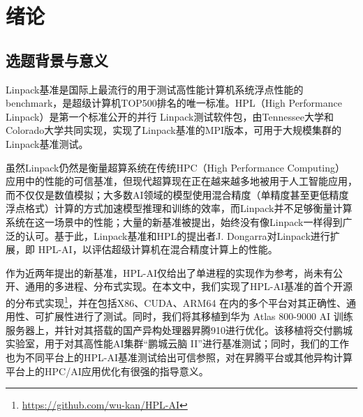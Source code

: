 
\chapter{绪论}

\label{绪论}

\section{选题背景与意义}


Linpack\cite{dongarra1979linpack}基准是国际上最流行的用于测试高性能计算机系统浮点性能的 benchmark，是超级计算机TOP500排名的唯一标准。HPL\cite{HPL}（High Performance Linpack）是第一个标准公开的并行 Linpack测试软件包，由Tennessee大学和Colorado大学共同实现，实现了Linpack基准的MPI版本，可用于大规模集群的Linpack基准测试。

虽然Linpack仍然是衡量超算系统在传统HPC（High Performance Computing） 应用中的性能的可信基准，但现代超算现在正在越来越多地被用于人工智能应用，而不仅仅是数值模拟；大多数AI领域的模型使用混合精度（单精度甚至更低精度浮点格式）计算的方式加速模型推理和训练的效率，而Linpack并不足够衡量计算系统在这一场景中的性能；大量的新基准被提出，始终没有像Linpack一样得到广泛的认可。基于此，Linpack基准和HPL的提出者J. Dongarra对Linpack进行扩展，即 HPL-AI\cite{dongarrahpl}，以评估超级计算机在混合精度计算上的性能。

作为近两年提出的新基准，HPL-AI仅给出了单进程的实现作为参考，尚未有公开、通用的多进程、分布式实现。在本文中，我们实现了HPL-AI基准的首个开源的分布式实现\footnote{\url{https://github.com/wu-kan/HPL-AI}}，并在包括X86、CUDA、ARM64 在内的多个平台对其正确性、通用性、可扩展性进行了测试。同时，我们将其移植到华为 Atlas 800-9000 AI 训练服务器上，并针对其搭载的国产异构处理器昇腾910进行优化。该移植将交付鹏城实验室，用于对其高性能AI集群``鹏城云脑 II''进行基准测试；同时，我们的工作也为不同平台上的HPL-AI基准测试给出可信参照，对在昇腾平台或其他异构计算平台上的HPC/AI应用优化有很强的指导意义。

